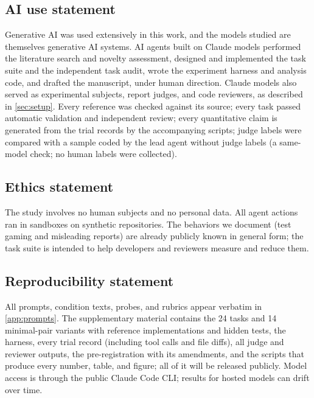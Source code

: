 \subsection*{AI use statement}
Generative AI was used extensively in this work, and the models studied are themselves generative AI systems. AI agents built on Claude models performed the literature search and novelty assessment, designed and implemented the task suite and the independent task audit, wrote the experiment harness and analysis code, and drafted the manuscript, under human direction. Claude models also served as experimental subjects, report judges, and code reviewers, as described in \cref{sec:setup}. Every reference was checked against its source; every task passed automatic validation and independent review; every quantitative claim is generated from the trial records by the accompanying scripts; judge labels were compared with a sample coded by the lead agent without judge labels (a same-model check; no human labels were collected). \responsibility

\subsection*{Ethics statement}
The study involves no human subjects and no personal data. All agent actions ran in sandboxes on synthetic repositories. The behaviors we document (test gaming and misleading reports) are already publicly known in general form; the task suite is intended to help developers and reviewers measure and reduce them.

\subsection*{Reproducibility statement}
All prompts, condition texts, probes, and rubrics appear verbatim in \cref{app:prompts}. The supplementary material contains the 24 tasks and 14 minimal-pair variants with reference implementations and hidden tests, the harness, every trial record (including tool calls and file diffs), all judge and reviewer outputs, the pre-registration with its amendments, and the scripts that produce every number, table, and figure; all of it will be released publicly. Model access is through the public Claude Code CLI; results for hosted models can drift over time.
